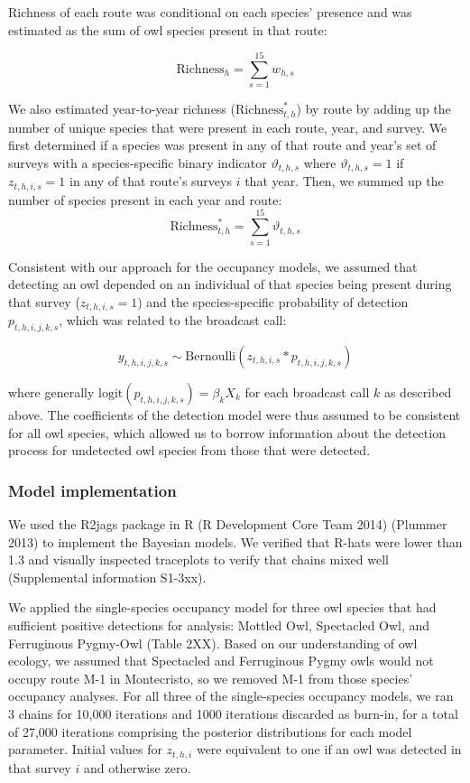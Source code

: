 \documentclass[
]{article}
\begin{document}
Richness of each route was conditional on each species' presence and was
estimated as the sum of owl species present in that route:

\[
\text{Richness}_{h} = \sum_{s=1}^{15} w_{h,s} 
\]

We also estimated year-to-year richness (\(\text{Richness}^*_{t,h}\)) by
route by adding up the number of unique species that were present in
each route, year, and survey. We first determined if a species was
present in any of that route and year's set of surveys with a
species-specific binary indicator \(\vartheta_{t,h,s}\) where
\(\vartheta_{t,h,s} = 1\) if \(z_{t,h,i,s} = 1\) in any of that route's
surveys \(i\) that year. Then, we summed up the number of species
present in each year and route: \[
\text{Richness}^*_{t,h} = \sum_{s=1}^{15} \vartheta_{t,h,s} 
\]

Consistent with our approach for the occupancy models, we assumed that
detecting an owl depended on an individual of that species being present
during that survey (\(z_{t,h,i,s} = 1\)) and the species-specific
probability of detection \(p_{t,h,i,j,k,s}\), which was related to the
broadcast call:

\[
y_{t,h,i,j,k,s} \sim \text{Bernoulli}(z_{t,h,i,s}*p_{t,h,i,j,k,s})
\]

where generally \(\text{logit}(p_{t,h,i,j,k,s}) = \beta_kX_k\) for each
broadcast call \(k\) as described above. The coefficients of the
detection model were thus assumed to be consistent for all owl species,
which allowed us to borrow information about the detection process for
undetected owl species from those that were detected.

\hypertarget{model-implementation}{%
\subsubsection{Model implementation}\label{model-implementation}}

We used the R2jags package in R (R Development Core Team 2014) (Plummer
2013) to implement the Bayesian models. We verified that R-hats were
lower than 1.3 and visually inspected traceplots to verify that chains
mixed well (Supplemental information S1-3xx).

We applied the single-species occupancy model for three owl species that
had sufficient positive detections for analysis: Mottled Owl, Spectacled
Owl, and Ferruginous Pygmy-Owl (Table 2XX). Based on our understanding
of owl ecology, we assumed that Spectacled and Ferruginous Pygmy owls
would not occupy route M-1 in Montecristo, so we removed M-1 from those
species' occupancy analyses. For all three of the single-species
occupancy models, we ran 3 chains for 10,000 iterations and 1000
iterations discarded as burn-in, for a total of 27,000 iterations
comprising the posterior distributions for each model parameter. Initial
values for \(z_{t,h,i}\) were equivalent to one if an owl was detected
in that survey \(i\) and otherwise zero.
\end{document}
